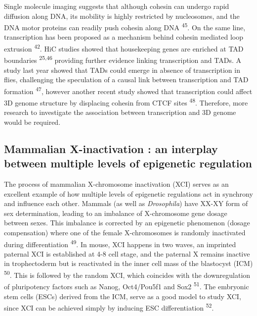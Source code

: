 \documentclass[11pt,twoside]{MPIthesis}
\theoremstyle{definition}
\theoremstyle{definition}
\theoremstyle{definition}
\theoremstyle{remark}
\begin{document}
Single molecule imaging suggests that although cohesin can undergo rapid
diffusion along DNA, its mobility is highly restricted by nucleosomes,
and the DNA motor proteins can readily push cohesin along DNA
\textsuperscript{45}. On the same line, transcription has been proposed
as a mechanism behind cohesin mediated loop extrusion
\textsuperscript{42}. HiC studies showed that housekeeping genes are
enriched at TAD boundaries \textsuperscript{25,46} providing further
evidence linking transcription and TADs. A study last year showed that
TADs could emerge in absence of transcription in flies, challenging the
speculation of a causal link between transcription and TAD formation
\textsuperscript{47}, however another recent study showed that
transcription could affect 3D genome structure by displacing cohesin
from CTCF sites \textsuperscript{48}. Therefore, more research to
investigate the association between transcription and 3D genome would be
required.

\subsection{Mammalian X-inactivation : an interplay between multiple
levels of epigenetic
regulation}\label{mammalian-x-inactivation-an-interplay-between-multiple-levels-of-epigenetic-regulation}

The process of mammalian X-chromosome inactivation (XCI) serves as an
excellent example of how multiple levels of epigenetic regulations act
in synchrony and influence each other. Mammals (as well as
\emph{Drosophila}) have XX-XY form of sex determination, leading to an
imbalance of X-chromosome gene dosage between sexes. This imbalance is
corrected by an epigenetic phenomenon (dosage compensation) where one of
the female X-chromosomes is randomly inactivated during differentiation
\textsuperscript{49}. In mouse, XCI happens in two waves, an imprinted
paternal XCI is established at 4-8 cell stage, and the paternal X
remains inactive in trophectoderm but is reactivated in the inner cell
mass of the blastocyst (ICM) \textsuperscript{50}. This is followed by
the random XCI, which coincides with the downregulation of pluripotency
factors such as Nanog, Oct4/Pou5f1 and Sox2 \textsuperscript{51}. The
embryonic stem cells (ESCs) derived from the ICM, serve as a good model
to study XCI, since XCI can be achieved simply by inducing ESC
differentiation \textsuperscript{52}.
\end{document}
